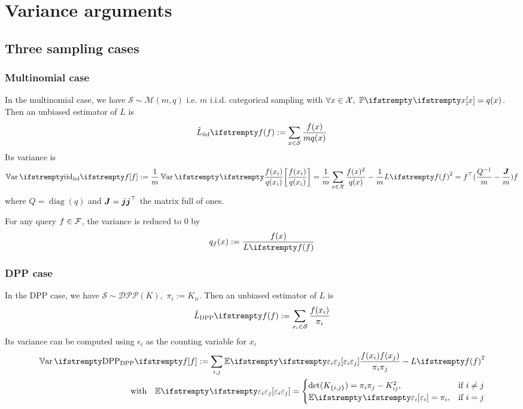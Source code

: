 \section{Variance arguments}
\subsection{Three sampling cases}
\subsubsection{Multinomial case}


In the multinomial case, we have $\mathcal S \sim \mathcal M(m, q)$ i.e. $m$ i.i.d. categorical sampling with $\forall x \in \mathcal{X},\ \PP{}{x} = q(x)$.
Then an unbiased estimator of $L$ is
\begin{equation*}
	\estloss{\textrm{iid}}{\query} := \sum_{x\in \mathcal S} \frac{\query(x)}{m q(x)}
\end{equation*}
Its variance is
\begin{equation}
	\Var{\textrm{iid}}{\query} :=\frac{1}{m} \Var{}{\frac {\query(x_i)} {q(x_i)}}
	=\frac{1}{m} \sum_{x \in \mathcal{X}} \frac{\query(x)^{2}}{q(x)} -\frac{1}{m} \loss{\query}^{2} = \query\T(\frac{Q^{-1}} m - \frac{\moones} m)\query
\end{equation}
where $Q = \operatorname{diag}(q)$ and $\boldsymbol{J} = \boldsymbol{j} \boldsymbol{j} ^\top$ the matrix full of ones. 

For any query $f \in \mathcal{F}$, the variance is reduced to 0 by
$$
q_{\query}(x):=\frac{ \query(x)}{\loss{\query}}
$$


\subsubsection{DPP case}
In the DPP case, we have $ \mathcal S \sim \mathcal{DPP}(K)$, \,$\pi_i := K_{ii}$. Then an unbiased estimator of $L$ is
\begin{equation*}
	\estloss{\textrm{DPP}}{\query} := \sum_{x_i\in \mathcal S} \frac{\query(x_i)}{\pi_i}
\end{equation*}
Its variance can be computed using $\epsilon_i$ as the counting variable for $x_i$
\begin{align*}
	\Var{\textrm{DPP}}{\query}
:=\sum_{i, j}\EE{}{\epsilon_{i} \epsilon_{j}} \frac{\query(x_{i}) \query(x_{j})} {\pi_{i} \pi_{j}}  - \loss{\query}^{2}\\
\quad \text{with} \quad
\EE{}{\epsilon_{i} \epsilon_{j}}=
\begin{cases}
	\det(K_{\{i, j\}})=\pi_{i} \pi_{j}-K_{ij}^{2}, & \text{if } i \neq j \\
	\EE{}{\epsilon_{i}}=\pi_{i},&\text{if } i = j
\end{cases}
\end{align*}



